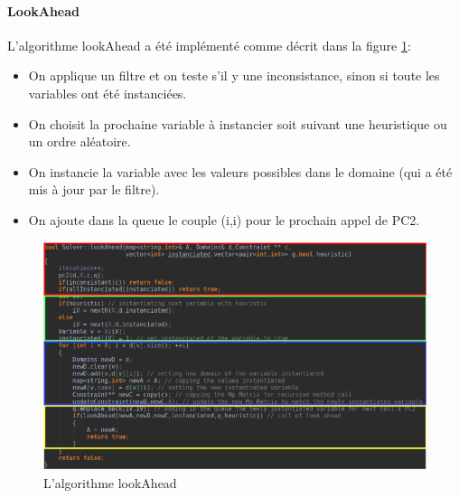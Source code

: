 \documentclass[12pt]{report}
\begin{document}
\paragraph{LookAhead}
L’algorithme lookAhead a été implémenté comme décrit dans la figure \ref{fig:LookAhead}:
\begin{itemize}
\item On applique un filtre et on teste s’il y une inconsistance, sinon si toute les variables ont été instanciées.

\item On choisit la prochaine variable à instancier soit suivant une heuristique ou un ordre aléatoire.

\item On instancie la variable avec les valeurs possibles dans le domaine (qui a été mis à jour par le filtre).

\item On ajoute dans la queue le couple (i,i) pour le prochain appel de PC2.
\end{itemize}
\begin{figure}[H]
	\centering
	\includegraphics[scale=0.7]{imgs/lookA.png}
	\caption{L'algorithme lookAhead}
	\label{fig:LookAhead}
\end{figure}
\end{document}
